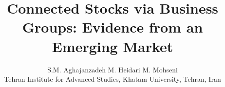 \title{{Connected Stocks via Business Groups: Evidence from an Emerging Market}}
\author{{S.M. Aghajanzadeh\sym{*} \qquad M. Heidari\sym{*} \qquad M. Mohseni\sym{*} }\\
{\sym{*} \footnotesize  Tehran Institute for Advanced Studies, Khatam University, Tehran, Iran}
}